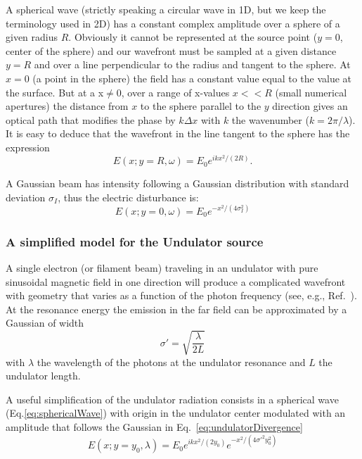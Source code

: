 \documentclass[]{spie}  %
\begin{document}
A spherical wave (strictly speaking a circular wave in 1D, but we keep the terminology used in 2D) has a constant complex amplitude over a sphere of a given radius $R$. Obviously it cannot be represented at the source point ($y=0$, center of the sphere) and our wavefront must be sampled at a given distance $y=R$ and over a line perpendicular to the radius and tangent to the sphere. At $x=0$ (a point in the sphere) the field has a constant value equal to the value at the surface. But at a x$\ne$0, over a range of x-values $x<<R$ (small numerical apertures) the distance from $x$ to the sphere parallel to the $y$ direction gives an optical path that modifies the phase by $k \Delta x$ with $k$ the wavenumber ($k = 2 \pi / \lambda$). It is easy to deduce that the wavefront in the line tangent to the sphere has the expression
\begin{equation}
\label{eq:sphericalWave}
    E(x;y=R,\omega)  = E_0 e^{i k x^2 / (2 R)}.
\end{equation}



A Gaussian beam has intensity following a Gaussian distribution with standard deviation $\sigma_I$, thus the electric disturbance is: 
\begin{equation}
    E(x;y=0,\omega) = E_0 e^{-x^2 / (4 \sigma_I^2)}
\end{equation}


\subsubsection{A simplified model for the Undulator source}
\label{sec:undulator}

A single electron (or filament beam) traveling in an undulator with pure sinusoidal magnetic field in one direction will produce a complicated wavefront with geometry that varies as a function of the photon frequency (see, e.g., Ref.~\cite{elleaume}). At the resonance energy the emission in the far field can be approximated by a Gaussian of width \cite{elleaume}
\begin{equation}
\label{eq:undulatorDivergence}
    \sigma' = \sqrt{\frac{\lambda}{2 L}}
\end{equation}
with $\lambda$ the wavelength of the photons at the undulator resonance and $L$ the undulator length. 

A useful simplification of the undulator radiation consists in a spherical wave (Eq.\ref{eq:sphericalWave}) with origin in the undulator center modulated with an amplitude that follows the Gaussian in Eq.~\ref{eq:undulatorDivergence}
\begin{equation}
    E(x;y=y_0,\lambda) = E_0 e^{i k x^2 / (2 y_0)} e^{-x^2/(4 \sigma'^2 y_0^2)}
\end{equation}
\end{document}
